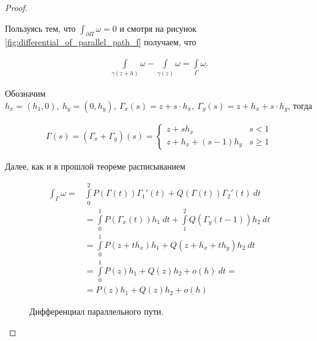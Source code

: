 \documentclass[../complex-analysis.tex]{subfiles}
\begin{document}
\begin{proof}
\begin{itemize}
	Пользуясь тем, что $\int_{\partial\Pi} \omega = 0$ и смотря на рисунок \eqref{fig:differential_of_parallel_path_f} получаем, что 


 \begin{align*}
   \int\limits_{\gamma(z+h)}  \omega - \int\limits_{\gamma(z)}  \omega = \int\limits_{\Gamma} \omega. 
 \end{align*}

 Обозначим $h_x = (h_1, 0), \ h_y = (0, h_y), \  \Gamma_x(s) = z + s \cdot h_x, \ \Gamma_y(s) = z + h_x + s \cdot h_y$, тогда

 \begin{align*}
	 \Gamma(s) = (\Gamma_x + \Gamma_y)(s) = \begin{cases} 
		 z + s h_x & s < 1 \\ 
		 z + h_x + (s - 1) h_y & s \geqslant 1
	 \end{cases}
 \end{align*}

 Далее, как и в прошлой теореме расписыванием

 \begin{align*}
	 \int_{\Gamma} \omega = & \int\limits_0^2 P(\Gamma(t))\Gamma_1'(t) + Q(\Gamma(t)) \Gamma_2'(t) \ dt \\
													&= \int\limits_{0}^{1} P(\Gamma_x(t)) h_1 \ dt + \int\limits_1^2 Q(\Gamma_y(t - 1)) h_2 \ dt \\
													&= \int\limits_0^1 P(z + th_x) h_1 + Q(z + h_x + t h_y) h_2 \ dt \\
													&= \int\limits_0^1 P(z) h_1 + Q(z) h_2 + o(h) \ dt = \\
													&= P(z) h_1 + Q(z) h_2 + o(h)
 \end{align*}


\begin{figure}[ht]
    \centering
    \caption{Дифференциал параллельного пути.}
    \label{fig:differential_of_parallel_path_f}
\end{figure}

\end{itemize}
\end{proof}
\end{document}
